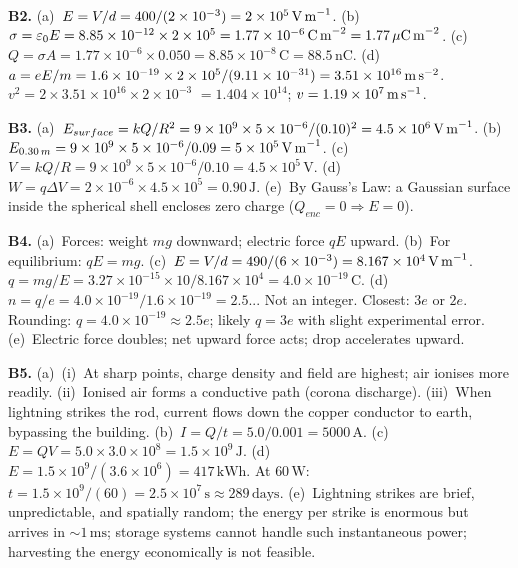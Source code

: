 \textbf{B2.}
(a)~$E=V/d=400/(2\times10^{-3})
=2\times10^5\,\text{V\,m}^{-1}$. \quad
(b)~$\sigma=\varepsilon_0E=8.85\times10^{-12}
\times2\times10^5=1.77\times10^{-6}\,\text{C\,m}^{-2}
=1.77\,\mu\text{C\,m}^{-2}$. \quad
(c)~$Q=\sigma A=1.77\times10^{-6}\times0.050
=8.85\times10^{-8}\,\text{C}=88.5\,\text{nC}$. \quad
(d)~$a=eE/m=1.6\times10^{-19}\times2\times10^5/
(9.11\times10^{-31})=3.51\times10^{16}\,\text{m\,s}^{-2}$.
$v^2=2\times3.51\times10^{16}\times2\times10^{-3}$
$=1.404\times10^{14}$; $v=1.19\times10^7\,\text{m\,s}^{-1}$.

\textbf{B3.}
(a)~$E_{surface}=kQ/R^2
=9\times10^9\times5\times10^{-6}/(0.10)^2
=4.5\times10^6\,\text{V\,m}^{-1}$. \quad
(b)~$E_{0.30\,m}=9\times10^9\times5\times10^{-6}/0.09
=5\times10^5\,\text{V\,m}^{-1}$. \quad
(c)~$V=kQ/R=9\times10^9\times5\times10^{-6}/0.10
=4.5\times10^5\,\text{V}$. \quad
(d)~$W=q\Delta V=2\times10^{-6}\times4.5\times10^5
=0.90\,\text{J}$. \quad
(e)~By Gauss's Law: a Gaussian surface inside the
spherical shell encloses zero charge
($Q_{enc}=0\Rightarrow E=0$).

\textbf{B4.}
(a)~Forces: weight $mg$ downward;
electric force $qE$ upward. \quad
(b)~For equilibrium: $qE=mg$. \quad
(c)~$E=V/d=490/(6\times10^{-3})
=8.167\times10^4\,\text{V\,m}^{-1}$.
$q=mg/E=3.27\times10^{-15}\times10/8.167\times10^4
=4.0\times10^{-19}\,\text{C}$. \quad
(d)~$n=q/e=4.0\times10^{-19}/1.6\times10^{-19}
=2.5$... Not an integer. Closest: $3e$ or $2e$.
Rounding: $q=4.0\times10^{-19}\approx2.5e$;
likely $q=3e$ with slight experimental error. \quad
(e)~Electric force doubles; net upward force acts;
drop accelerates upward.

\textbf{B5.}
(a)~(i)~At sharp points, charge density and field are
highest; air ionises more readily. (ii)~Ionised air
forms a conductive path (corona discharge). (iii)~When
lightning strikes the rod, current flows down the
copper conductor to earth, bypassing the building. \quad
(b)~$I=Q/t=5.0/0.001=5000\,\text{A}$. \quad
(c)~$E=QV=5.0\times3.0\times10^8
=1.5\times10^9\,\text{J}$. \quad
(d)~$E=1.5\times10^9/(3.6\times10^6)
=417\,\text{kWh}$. At $60\,\text{W}$:
$t=1.5\times10^9/(60)=2.5\times10^7\,\text{s}
\approx289\,\text{days}$. \quad
(e)~Lightning strikes are brief, unpredictable,
and spatially random; the energy per strike is
enormous but arrives in $\sim1\,\text{ms}$; storage
systems cannot handle such instantaneous power;
harvesting the energy economically is not feasible.

\endgroup

